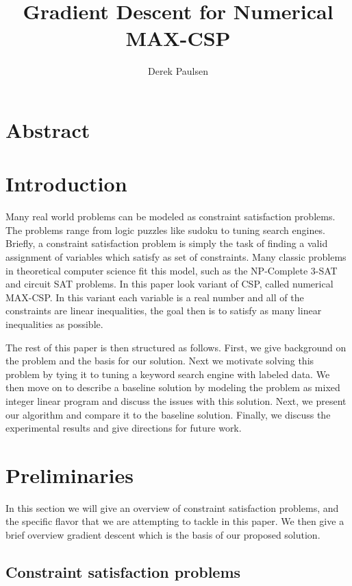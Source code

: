 \documentclass[a4paper]{article}
\title{Gradient Descent for Numerical MAX-CSP} %
\author{
Derek Paulsen \\
}
\date{}
\begin{document}
\maketitle 


\section{Abstract}
\section{Introduction}


Many real world problems can be modeled as constraint 
satisfaction problems. The problems range from logic puzzles 
like sudoku to tuning search engines. Briefly, a constraint satisfaction 
problem is simply the task of finding a valid assignment of variables 
which satisfy as set of constraints. Many classic problems in theoretical computer 
science fit this model, such as the NP-Complete 3-SAT and circuit SAT problems. In this paper 
look variant of CSP, called numerical MAX-CSP. In this variant each variable is a real number
and all of the constraints are linear inequalities, the goal then is to satisfy as 
many linear inequalities as possible. 

The rest of this paper is then structured as follows. First, we give background on the problem 
and the basis for our solution. Next we motivate solving this problem by tying it to 
tuning a keyword search engine with labeled data. We then move on to describe a baseline 
solution by modeling the problem as mixed integer linear program and discuss the issues with 
this solution. Next, we present our algorithm and compare it to the baseline solution. Finally, 
we discuss the experimental results and give directions for future work.

\section{Preliminaries}

In this section we will give an overview of constraint satisfaction problems,
and the specific flavor that we are attempting to tackle in this paper. We then 
give a brief overview gradient descent which is the basis of our proposed solution.

\subsection{Constraint satisfaction problems}
\end{document}
